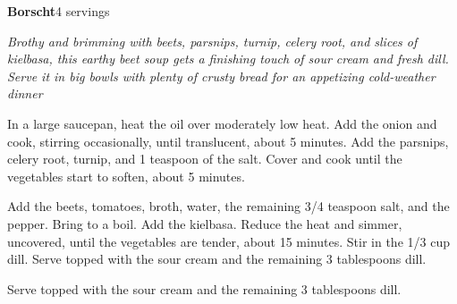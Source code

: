 \documentclass[../recipe-collections/cooking.tex]{subfiles}
\begin{document}
\begin{recipe}{\textbf{Borscht}}{4 servings}{}

  \freeform{}\textit{Brothy and brimming with beets, parsnips, turnip, 
  celery root, and slices of kielbasa, this earthy beet soup gets a 
  finishing touch of sour cream and fresh dill. Serve it in big bowls 
  with plenty of crusty bread for an appetizing cold-weather dinner}


  In a large saucepan, heat the oil over moderately low heat. Add the onion 
  and cook, stirring occasionally, until translucent, about 5 minutes. 
  Add the parsnips, celery root, turnip, and 1 teaspoon of the salt. 
  Cover and cook until the vegetables start to soften, about 5 minutes.


  Add the beets, tomatoes, broth, water, the remaining 3/4 teaspoon salt, 
  and the pepper. Bring to a boil. Add the kielbasa. Reduce the heat and 
  simmer, uncovered, until the vegetables are tender, about 15 minutes. 
  Stir in the 1/3 cup dill. Serve topped with the sour cream and the 
  remaining 3 tablespoons dill.


  Serve topped with the sour cream and the remaining 3 tablespoons dill.


\end{recipe}
\end{document}
